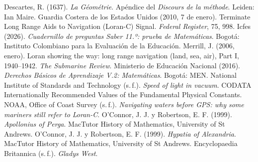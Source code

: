 \documentclass[11pt]{article}
\begin{document}
\begin{referencias}
 Descartes, R. (1637). \emph{La Géométrie}. Apéndice del
  \emph{Discours de la méthode}. Leiden: Ian Maire.
 Guardia Costera de los Estados Unidos (2010, 7 de enero). Terminate
  Long Range Aids to Navigation (Loran-C) Signal. \emph{Federal Register}, 75, 998.
 Icfes (2026). \emph{Cuadernillo de preguntas Saber 11.º: prueba de
  Matemáticas}. Bogotá: Instituto Colombiano para la Evaluación de la Educación.
 Merrill, J. (2006, enero). Loran showing the way: long range
  navigation (land, sea, air), Part I, 1940--1942. \emph{The Submarine Review}.
 Ministerio de Educación Nacional (2016). \emph{Derechos Básicos de
  Aprendizaje V.2: Matemáticas}. Bogotá: MEN.
 National Institute of Standards and Technology (s.\,f.). \emph{Speed of
  light in vacuum}. CODATA Internationally Recommended Values of the Fundamental
  Physical Constants.
 NOAA, Office of Coast Survey (s.\,f.). \emph{Navigating waters before
  GPS: why some mariners still refer to Loran-C}.
 O'Connor, J. J. y Robertson, E. F. (1999). \emph{Apollonius
  of Perga}. MacTutor History of Mathematics, University of St Andrews.
 O'Connor, J. J. y Robertson, E. F. (1999). \emph{Hypatia of
  Alexandria}. MacTutor History of Mathematics, University of St Andrews.
 Encyclopaedia Britannica (s.\,f.). \emph{Gladys West}.
\end{referencias}
\end{document}
